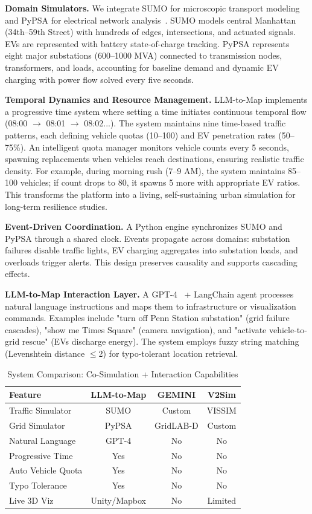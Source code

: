 \documentclass[sigconf,review,nonacm]{acmart}
\begin{document}
\noindent\textbf{Domain Simulators.}
We integrate SUMO for microscopic transport modeling~\cite{lopez2018sumo} and PyPSA for electrical network analysis~\cite{brown2018pypsa}. SUMO models central Manhattan (34th–59th Street) with hundreds of edges, intersections, and actuated signals. EVs are represented with battery state-of-charge tracking. PyPSA represents eight major substations (600–1000 MVA) connected to transmission nodes, transformers, and loads, accounting for baseline demand and dynamic EV charging with power flow solved every five seconds.

\noindent\textbf{Temporal Dynamics and Resource Management.}
LLM-to-Map implements a progressive time system where setting a time initiates continuous temporal flow (08:00 $\rightarrow$ 08:01 $\rightarrow$ 08:02...). The system maintains nine time-based traffic patterns, each defining vehicle quotas (10–100) and EV penetration rates (50–75\%). An intelligent quota manager monitors vehicle counts every 5 seconds, spawning replacements when vehicles reach destinations, ensuring realistic traffic density. For example, during morning rush (7–9 AM), the system maintains 85–100 vehicles; if count drops to 80, it spawns 5 more with appropriate EV ratios. This transforms the platform into a living, self-sustaining urban simulation for long-term resilience studies.

\noindent\textbf{Event-Driven Coordination.}
A Python engine synchronizes SUMO and PyPSA through a shared clock. Events propagate across domains: substation failures disable traffic lights, EV charging aggregates into substation loads, and overloads trigger alerts. This design preserves causality and supports cascading effects.

\noindent\textbf{LLM-to-Map Interaction Layer.}
A GPT-4~\cite{achiam2023gpt} + LangChain agent processes natural language instructions and maps them to infrastructure or visualization commands. Examples include "turn off Penn Station substation" (grid failure cascades), "show me Times Square" (camera navigation), and "activate vehicle-to-grid rescue" (EVs discharge energy). The system employs fuzzy string matching (Levenshtein distance $\leq$2) for typo-tolerant location retrieval.

\begin{table}[t]
\centering
\caption{System Comparison: Co-Simulation + Interaction Capabilities}
\small
\begin{tabular}{lccc}
\toprule
\textbf{Feature} & \textbf{LLM-to-Map} & \textbf{GEMINI} & \textbf{V2Sim} \\
\midrule
Traffic Simulator & SUMO & Custom & VISSIM \\
Grid Simulator & PyPSA & GridLAB-D & Custom \\
Natural Language & GPT-4 & No & No \\
Progressive Time & Yes & No & No \\
Auto Vehicle Quota & Yes & No & No \\
Typo Tolerance & Yes & No & No \\
Live 3D Viz & Unity/Mapbox & No & Limited \\
\bottomrule
\end{tabular}
\end{table}
\end{document}
